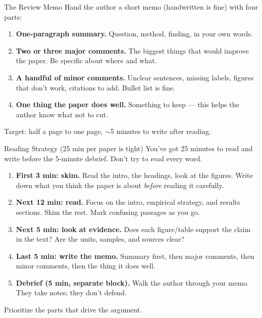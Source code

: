 \begin{frame}{The Review Memo}
  \small
  Hand the author a short memo (handwritten is fine) with four parts:

  \vspace{4pt}

  \begin{enumerate}\setlength\itemsep{2pt}
    \item \textbf{One-paragraph summary.} Question, method, finding, in your own words.

    \item \textbf{Two or three major comments.} The biggest things that would improve the paper. Be specific about where and what.

    \item \textbf{A handful of minor comments.} Unclear sentences, missing labels, figures that don't work, citations to add. Bullet list is fine.

    \item \textbf{One thing the paper does well.} Something to keep --- this helps the author know what not to cut.
  \end{enumerate}

  \vspace{6pt}

  Target: half a page to one page, $\sim$5 minutes to write after reading.
\end{frame}

\begin{frame}{Reading Strategy (25 min per paper is tight)}
  \footnotesize
  You've got 25 minutes to read and write before the 5-minute debrief. Don't try to read every word.

  \vspace{6pt}

  \begin{enumerate}\setlength\itemsep{2pt}
    \item \textbf{First 3 min: skim.} Read the intro, the headings, look at the figures. Write down what you think the paper is about \emph{before} reading it carefully.

    \item \textbf{Next 12 min: read.} Focus on the intro, empirical strategy, and results sections. Skim the rest. Mark confusing passages as you go.

    \item \textbf{Next 5 min: look at evidence.} Does each figure/table support the claim in the text? Are the units, samples, and sources clear?

    \item \textbf{Last 5 min: write the memo.} Summary first, then major comments, then minor comments, then the thing it does well.

    \item \textbf{Debrief (5 min, separate block).} Walk the author through your memo. They take notes; they don't defend.
  \end{enumerate}

  \vspace{4pt}

  Prioritize the parts that drive the argument.
\end{frame}

